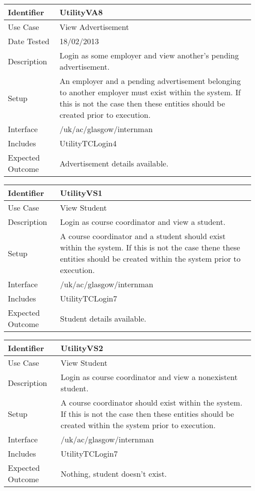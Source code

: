 \vspace{2em}

\begin{tabularx}{\textwidth}{|T|L|}
\hline
Identifier & UtilityVA8\\
\hline
Use Case & View Advertisement \\
\hline
Date Tested & 18/02/2013\\
\hline
Description & Login as some employer and view another's pending advertisement.\\
\hline
Setup & An employer and a pending advertisement belonging to another
employer must exist within the system. If this is not the case then
these entities should be created prior to execution. \\
\hline
Interface & /uk/ac/glasgow/internman \\
\hline
Includes & UtilityTCLogin4\\
\hline
Expected Outcome & Advertisement details available.\\
\hline
\end{tabularx}

\vspace{2em}

\begin{tabularx}{\textwidth}{|T|L|}
\hline
Identifier & UtilityVS1\\
\hline
Use Case & View Student \\
\hline
Description & Login as course coordinator and view a student.\\
\hline
Setup & A course coordinator and a student should exist within the
system. If this is not the case thene these entities should be created
within the system prior to execution.\\
\hline
Interface & /uk/ac/glasgow/internman \\
\hline
Includes & UtilityTCLogin7\\
\hline
Expected Outcome & Student details available.\\
\hline
\end{tabularx}

\vspace{2em}

\begin{tabularx}{\textwidth}{|T|L|}
\hline
Identifier & UtilityVS2\\
\hline
Use Case & View Student \\
\hline
Description & Login as course coordinator and view a nonexistent student.\\
\hline
Setup & A course coordinator should exist within the system. If this
is not the case then these entities should be created within the system
prior to execution.\\
\hline
Interface & /uk/ac/glasgow/internman \\
\hline
Includes & UtilityTCLogin7\\
\hline
Expected Outcome & Nothing, student doesn't exist.\\
\hline
\end{tabularx}

